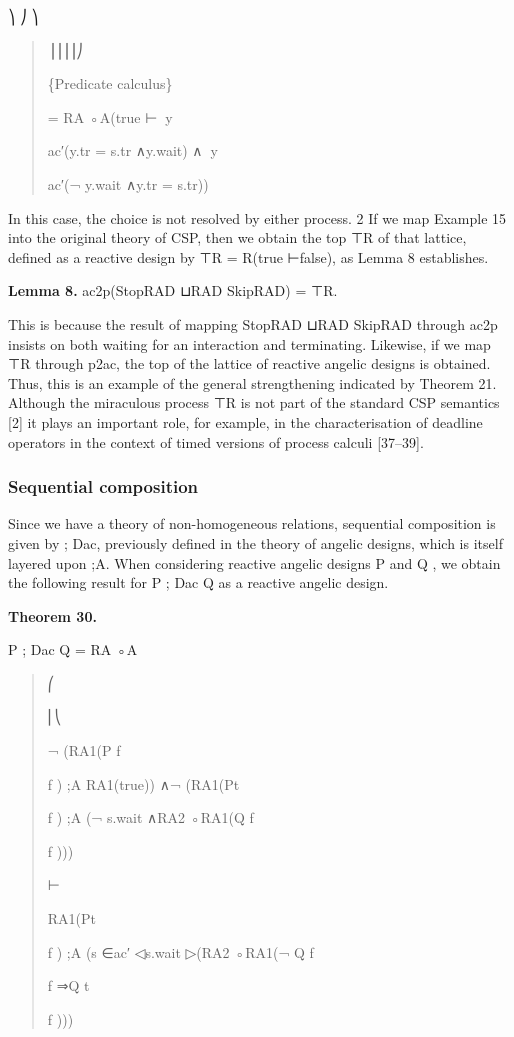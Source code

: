 \documentclass[11pt]{article}
\begin{document}
⎞ ⎠ ⎞

\begin{quote}\small\raggedright
⎟⎟⎟⎟⎠
\par
\{Predicate calculus\}
\par
= RA ◦A(true ⊢∈⃝y
\par
ac′(y.tr = s.tr ∧y.wait) ∧∈⃝y
\par
ac′(¬ y.wait ∧y.tr = s.tr))
\end{quote}

In this case, the choice is not resolved by either process. 2 If we map Example 15 into the original theory of CSP, then we obtain the top ⊤R of that lattice, defined as a reactive design by ⊤R = R(true ⊢false), as Lemma 8 establishes.

\noindent\textbf{Lemma 8.} ac2p(StopRAD ⊔RAD SkipRAD) = ⊤R.


This is because the result of mapping StopRAD ⊔RAD SkipRAD through ac2p insists on both waiting for an interaction and terminating. Likewise, if we map ⊤R through p2ac, the top of the lattice of reactive angelic designs is obtained. Thus, this is an example of the general strengthening indicated by Theorem 21. Although the miraculous process ⊤R is not part of the standard CSP semantics [2] it plays an important role, for example, in the characterisation of deadline operators in the context of timed versions of process calculi [37–39].

\subsubsection{Sequential composition}
Since we have a theory of non-homogeneous relations, sequential composition is given by ; Dac, previously defined in the theory of angelic designs, which is itself layered upon ;A. When considering reactive angelic designs P and Q , we obtain the following result for P ; Dac Q as a reactive angelic design.

\noindent\textbf{Theorem 30.}


P ; Dac Q = RA ◦A

\begin{quote}\small\raggedright
⎛
\par
⎜⎝
\par
¬ (RA1(P f
\par
f ) ;A RA1(true)) ∧¬ (RA1(Pt
\par
f ) ;A (¬ s.wait ∧RA2 ◦RA1(Q f
\par
f )))
\par
⊢
\par
RA1(Pt
\par
f ) ;A (s ∈ac′ ◁s.wait ▷(RA2 ◦RA1(¬ Q f
\par
f ⇒Q t
\par
f )))
\end{quote}
\end{document}
